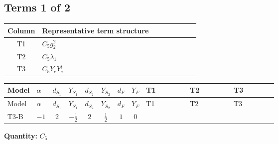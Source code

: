 \documentclass[8pt]{article}
\begin{document}
\begin{landscape}
\subsection*{Terms 1 of 2}
\begin{center}
\begin{tabular}{@{}c >{\raggedright\arraybackslash}p{0.82\linewidth}@{}}
\toprule
Column & Representative term structure \\
\midrule
T1 & \(\displaystyle C_{5} g_{2}^{2}\) \\
\midrule
T2 & \(\displaystyle C_{5} \lambda_1\) \\
\midrule
T3 & \(\displaystyle C_{5} Y_e Y_e^\dagger\) \\
\midrule
\bottomrule
\end{tabular}
\end{center}
\smallskip
\tiny
\begin{longtable}{@{}llcccccc >{\raggedright\arraybackslash}p{0.21\linewidth} >{\raggedright\arraybackslash}p{0.21\linewidth} >{\raggedright\arraybackslash}p{0.21\linewidth}@{}}
\toprule
Model & $\alpha$ & $d_{S_1}$ & $Y_{S_1}$ & $d_{S_2}$ & $Y_{S_2}$ & $d_F$ & $Y_F$ & T1 & T2 & T3 \\
\midrule
\endfirsthead
\toprule
Model & $\alpha$ & $d_{S_1}$ & $Y_{S_1}$ & $d_{S_2}$ & $Y_{S_2}$ & $d_F$ & $Y_F$ & T1 & T2 & T3 \\
\midrule
\endhead
T3-B & $-1$ & $2$ & $-\frac{1}{2}$ & $2$ & $\frac{1}{2}$ & $1$ & $0$ & \scriptsize\adjustbox{max width=\linewidth}{$\begin{gathered} - 3 C_{5} g_{2}^{2}\end{gathered}$} & \scriptsize\adjustbox{max width=\linewidth}{$\begin{gathered} 2 C_{5} \lambda_1\end{gathered}$} & \scriptsize\adjustbox{max width=\linewidth}{$\begin{gathered} - C_{5} Y_e Y_e^\dagger\end{gathered}$} \\
\midrule
\bottomrule
\end{longtable}
\clearpage
\noindent\textbf{Quantity: }$C_5$\par\smallskip

\end{landscape}
\end{document}

